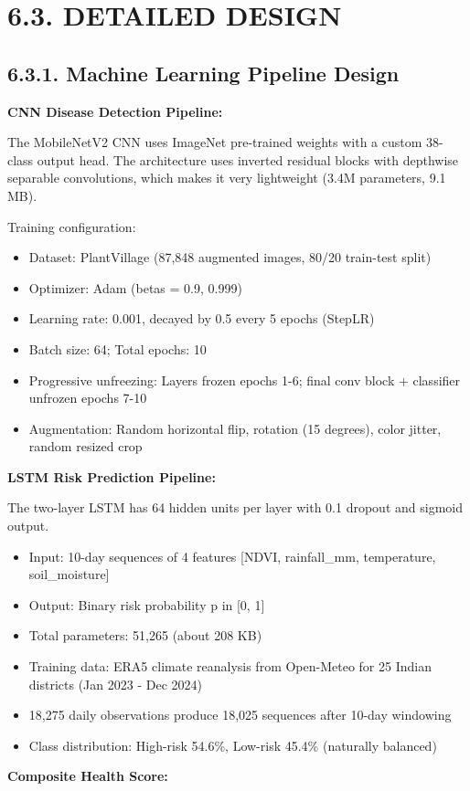 \documentclass[12pt, a4paper]{report}
\begin{document}
\section{6.3. DETAILED DESIGN}
\subsection{6.3.1. Machine Learning Pipeline Design}
\textbf{CNN Disease Detection Pipeline:}

The MobileNetV2 CNN uses ImageNet pre-trained weights with a custom 38-class output head. The architecture uses inverted residual blocks with depthwise separable convolutions, which makes it very lightweight (3.4M parameters, 9.1 MB).

Training configuration:

\begin{itemize}[leftmargin=*]
  \item Dataset: PlantVillage (87,848 augmented images, 80/20 train-test split)
  \item Optimizer: Adam (betas = 0.9, 0.999)
  \item Learning rate: 0.001, decayed by 0.5 every 5 epochs (StepLR)
  \item Batch size: 64; Total epochs: 10
  \item Progressive unfreezing: Layers frozen epochs 1-6; final conv block + classifier unfrozen epochs 7-10
  \item Augmentation: Random horizontal flip, rotation (15 degrees), color jitter, random resized crop
\end{itemize}
\textbf{LSTM Risk Prediction Pipeline:}

The two-layer LSTM has 64 hidden units per layer with 0.1 dropout and sigmoid output.

\begin{itemize}[leftmargin=*]
  \item Input: 10-day sequences of 4 features [NDVI, rainfall\_mm, temperature, soil\_moisture]
  \item Output: Binary risk probability p in [0, 1]
  \item Total parameters: 51,265 (about 208 KB)
  \item Training data: ERA5 climate reanalysis from Open-Meteo for 25 Indian districts (Jan 2023 - Dec 2024)
  \item 18,275 daily observations produce 18,025 sequences after 10-day windowing
  \item Class distribution: High-risk 54.6\%, Low-risk 45.4\% (naturally balanced)
\end{itemize}
\textbf{Composite Health Score:}
\end{document}
